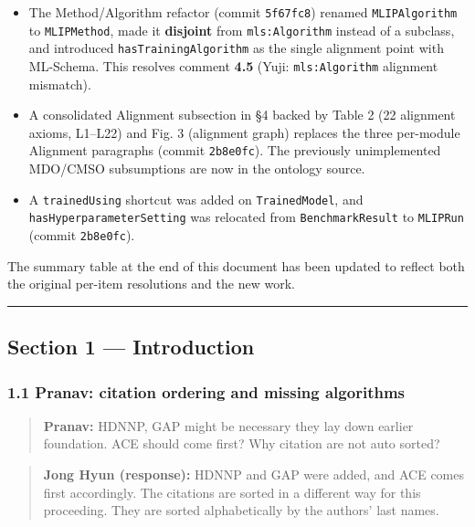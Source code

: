 \begin{itemize}
\tightlist
\item
  The Method/Algorithm refactor (commit \texttt{5f67fc8}) renamed \texttt{MLIPAlgorithm} to \texttt{MLIPMethod}, made it \textbf{disjoint} from \texttt{mls:Algorithm} instead of a subclass, and introduced \texttt{hasTrainingAlgorithm} as the single alignment point with ML-Schema. This resolves comment \textbf{4.5} (Yuji: \texttt{mls:Algorithm} alignment mismatch).
\item
  A consolidated Alignment subsection in §4 backed by Table 2 (22 alignment axioms, L1--L22) and Fig. 3 (alignment graph) replaces the three per-module Alignment paragraphs (commit \texttt{2b8e0fc}). The previously unimplemented MDO/CMSO subsumptions are now in the ontology source.
\item
  A \texttt{trainedUsing} shortcut was added on \texttt{TrainedModel}, and \texttt{hasHyperparameterSetting} was relocated from \texttt{BenchmarkResult} to \texttt{MLIPRun} (commit \texttt{2b8e0fc}).
\end{itemize}

The summary table at the end of this document has been updated to reflect both the original per-item resolutions and the new work.

\begin{center}\rule{0.5\linewidth}{0.5pt}\end{center}

\subsection{Section 1 --- Introduction}\label{section-1-introduction}

\subsubsection{1.1 Pranav: citation ordering and missing algorithms}\label{pranav-citation-ordering-and-missing-algorithms}

\begin{quote}
\textbf{Pranav:} HDNNP, GAP might be necessary they lay down earlier foundation. ACE should come first? Why citation are not auto sorted?
\end{quote}

\begin{quote}
\textbf{Jong Hyun (response):} HDNNP and GAP were added, and ACE comes first accordingly. The citations are sorted in a different way for this proceeding. They are sorted alphabetically by the authors' last names.
\end{quote}

